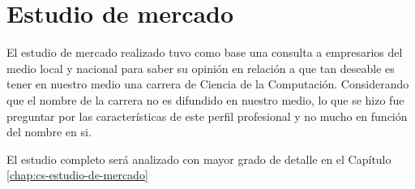 \section{Estudio de mercado}\label{sec:cs-estudio-de-mercado}

El estudio de mercado realizado tuvo como base una consulta a empresarios del medio local y nacional 
para saber su opinión en relación a que tan deseable es tener en nuestro medio una carrera de 
Ciencia de la Computación. Considerando que el nombre de la carrera no es difundido en nuestro 
medio, lo que se hizo fue preguntar por las características de este perfil profesional y no 
mucho en función del nombre en si.

El estudio completo será analizado con mayor grado de detalle en el Capítulo \ref{chap:cs-estudio-de-mercado}

